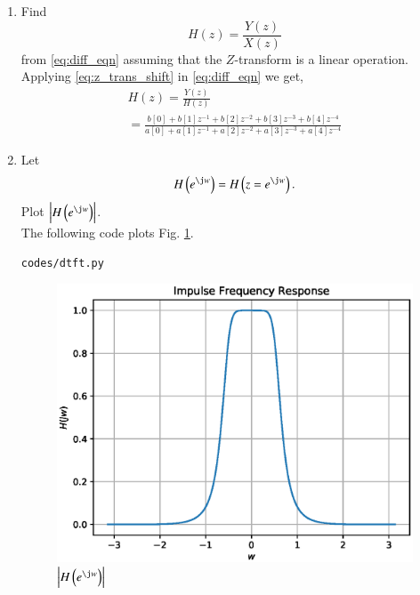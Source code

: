 \documentclass[journal,12pt,twocolumn]{IEEEtran}
\renewcommand\thesection{\arabic{section}}
\begin{document}
\begin{enumerate}[label=\thesection.\arabic*,ref=\thesection.\theenumi]
\item Find
%
\begin{equation}
H(z) = \frac{Y(z)}{X(z)}
\end{equation}
%
from  \eqref{eq:diff_eqn} assuming that the $Z$-transform is a linear operation.
\\
\solution  Applying \eqref{eq:z_trans_shift} in \eqref{eq:diff_eqn} we get,
\begin{equation}
\begin{split}
H(z) = \frac{Y(z)}{H(z)}                
\\
=\frac{b[0]+b[1]z^{-1}+b[2]z^{-2}+b[3]z^{-3}+b[4]z^{-4}}{a[0]+a[1]z^{-1}+a[2]z^{-2}+a[3]z^{-3}+a[4]z^{-4}}
\label{eq:freq_resp}
\end{split}
\end{equation}
%
\item 
Let
\begin{equation}
H\brak{e^{\j w}} = H\brak{z = e^{\j w}}.
\end{equation}
Plot $\abs{H\brak{e^{\j w}}}$.
\\
\solution
The following code plots Fig. \ref{fig:H(jw)}.
\begin{lstlisting}
codes/dtft.py
\end{lstlisting}
\begin{figure}[!ht]
\centering
\includegraphics[width=\columnwidth]{./figs/H(jw)}
\caption{$\abs{H\brak{e^{\j w}}}$}
\label{fig:H(jw)}
\end{figure}

\end{enumerate}
\end{document}
